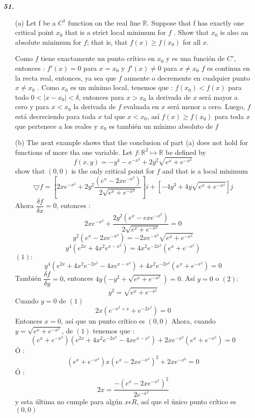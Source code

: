 \documentclass[a4paper,12pt]{article}
\begin{document}
\textit{\textbf{51.}}
	\begin{itemize}
		\item[(a)] Let f be a $C^1$ function on the real line $\mathbb{R}$. Suppose that f has exactly one critical point $x_{0}$ that is a strict local minimum for $f$ . Show that $x_{0}$ is also an absolute minimum for $f$; that is, that $f(x) \geq f(x_{0})$ for all $x$.
		
		Como $f$ tiene exactamente un punto crítico en $x_{0}$ y es una función de $C'$, entonces : 
		$f'(x) = 0$ para $x= x_{0}$ y $f'(x)\neq 0$ para $x\neq x_{0}$
		$f$ es continua en la recta real, entonces, ya sea que $f$ aumente o decremente en cualquier punto $x\neq x_{0}$ . Como $x_{0}$ es un mínimo local, tenemos que : 
		$f(x_0)< f(x)$ para todo $0<| x-x_{0}| < \delta$, entonces para $x> x_{0}$ la derivada de $x$ será mayor a cero y para $x<x_{0}$ la derivada de $f$ evaluada en $x$ será menor a cero. 
		Luego, $f$ está decreciendo para toda $x$ tal que $x<x_{0}$, así $f(x)\geq f(x_0)$ para toda $x$ que pertenece a los reales y $x_0$ es también un mínimo absoluto de $f$
		\item[(b)] The next example shows that the conclusion of part (a) does not hold for functions of more tha one variable. Let $f: \mathbb{R}^2 \mapsto \mathbb{R}$ be defined by 
		\[f(x,y) = -y^4-e^{-x^2}+2y^2 \sqrt{e^x + e^{-x^2}}\] 
		show that $(0,0)$ is the only critical point for $f$ and that is a local minimum
		\[\bigtriangledown f = \left[ 2xe^{-x^2}+2y^2 \dfrac{\left( e^x -2xe^{-x^2} \right)}{2\sqrt{e^x+e^{-x^2}}}\right]i +\left[-4y^3+4y \sqrt{e^x+e^{-x^2}} \right]j\]
		Ahora $\dfrac{\delta f}{\delta x} = 0$, entonces : 
		\[2xe^{-x^2}+ \dfrac{2y^2 \left(e^x-ex e^{-x^2} \right)}{2\sqrt{e^x + e^{-x^2}}}= 0\]
		\[y^2(e^x-2x e^{-x^2})= -2xe^{-x^2}\sqrt{e^x+ e^{-x^2}}\]
		\[y^4 \left(e^{2x}+4x^2 e^{x-x^2} \right) = 4x^2e^{-2x^2}\left(e^x + e^{-x^2}\right)\]
	$(1):$
		\[y^4\left(e^{2x}+4x^2e^{-2x^2}-4xe^{x-x^2} \right)+ 4x^2e^{-2x^2}\left( e^x+ e^{-x^2}\right)=0 \]
		También $\dfrac{\delta f}{\delta y} = 0$, entonces $4y\left(-y^2+ \sqrt{e^x + e^{-x^2}}\right)=0$. Así $y=0$ o $(2):$ 
		\[y^2= \sqrt{e^x+ e^{-x^2}}\]
		Cuando $y = 0$ de $(1)$
		\[2x \left(e^{-x^2+x}+ e^{-2x^2} \right)=0\]
		Entonces $x=0$, así que un punto crítico es $(0,0)$
		Ahora, cuando $y = \sqrt{e^x+ e^{-x^2}}$, de $(1)$ tenemos que :
		\[(e^x+ e^{-x^2})(e^{2x}+4x^2e^{-2x^2}-4xe^{x-x^2})+2xe^{-x^2}(e^x+ e^{-x^2})=0\]
		Ó : 
		\[(e^x+e^{-x^2})x(e^x-2xe^{-x^2})^2 +2xe^{-x^2}=0\]
		Ó :
		\[2x=\dfrac{-\left( e^x- 2xe^{-x^2}\right)^2}{2e^{-x^2}}\]
		y esta última no cumple para algún $x\epsilon R$, así que el único punto crítico es $(0,0)$

\end{itemize}
\end{document}
